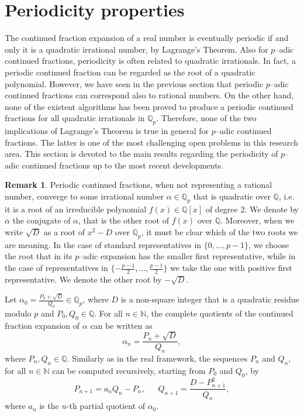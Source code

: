 \documentclass[12pt, reqno]{amsart}
\theoremstyle{plain}
\theoremstyle{definition}
\newtheorem{Remark}[Theorem]{Remark}
\begin{document}
\section{Periodicity properties}
\label{Sec: periodicity}
The continued fraction expansion of a real number is eventually periodic if and only it is a quadratic irrational number, by Lagrange's Theorem. Also for $p$--adic continued fractions, periodicity is often related to quadratic irrationals. In fact, a periodic continued fraction can be regarded as the root of a quadratic polynomial. However, we have seen in the previous section that periodic $p$--adic continued fractions can correspond also to rational numbers. On the other hand, none of the existent algorithms has been proved to produce a periodic continued fractions for all quadratic irrationals in $\mathbb{Q}_p$. Therefore, none of the two implications of Lagrange's Theorem is true in general for $p$--adic continued fractions. The latter is one of the most challenging open problems in this research area. This section is devoted to the main results regarding the periodicity of $p$--adic continued fractions up to the most recent developments.

\begin{Remark}
Periodic continued fractions, when not representing a rational number, converge to some irrational number $\alpha\in\mathbb{Q}_p$ that is quadratic over $\mathbb{Q}$, i.e. it is a root of an irreducible polynomial $f(x)\in\mathbb{Q}[x]$ of degree $2$. We denote by $\overline{\alpha}$ the conjugate of $\alpha$, that is the other root of $f(x)$ over $\mathbb{Q}$. Moreover, when we write $\sqrt{D}$ as a root of $x^2-D$ over $\mathbb{Q}_p$, it must be clear which of the two roots we are meaning. In the case of standard representatives in $\{0,\ldots,p-1\}$, we choose the root that in its $p$--adic expansion has the smaller first representative, while in the case of representatives in $\{-\frac{p-1}{2},\ldots,\frac{p-1}{2}\}$ we take the one with positive first representative. We denote the other root by $-\sqrt{D}$.
\end{Remark}

 Let $\alpha_0=\frac{P_0+\sqrt{D}}{Q_0}\in\mathbb{Q}_p$, where $D$ is a non-square integer that is a quadratic residue modulo $p$ and $P_0,Q_0\in\mathbb{Q}$. For all $n\in\mathbb{N}$, the complete quotients of the continued fraction expansion of $\alpha$ can be written as 
\begin{equation}\label{Eq: quadirr}
\alpha_n=\frac{P_n+\sqrt{D}}{Q_n},
\end{equation}
where $P_n,Q_n\in\mathbb{Q}$. Similarly as in the real framework, the sequences $P_n$ and $Q_n$, for all $n\in\mathbb{N}$ can be computed recursively, starting from $P_0$ and $Q_0$, by
\[P_{n+1}=a_nQ_n-P_n, \ \ \ \ \ \ \ Q_{n+1}=\frac{D-P^2_{n+1}}{Q_n},\]
where $a_n$ is the $n$-th partial quotient of $\alpha_0$.
\end{document}
